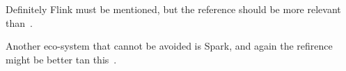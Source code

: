 
\label {fs-related-section}

Definitely Flink must be mentioned, but the reference should be more relevant than~\cite{Horvath:2017:CGS:3098572.3098579}.

Another eco-system that cannot be avoided is Spark, and again the refirence might be better tan this~\cite{Chen:2016:DRE:3006299.3006326}.


